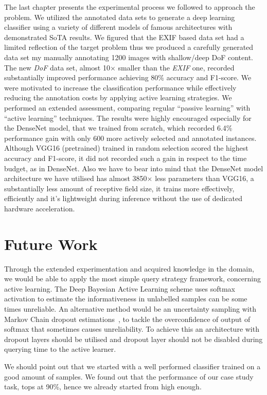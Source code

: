 The last chapter presents the experimental process we followed to approach the problem. We utilized the annotated data sets to generate a deep learning classifier using a variety of different models of famous architectures with demonstrated SoTA results. We figured that the EXIF based data set had a limited reflection of the target problem thus we produced a carefully generated data set my manually annotating 1200 images with shallow/deep DoF content. The new \textit{DoF} data set, almost 10$\times$ smaller than the \textit{EXIF} one, recorded substantially improved performance achieving 80\% accuracy and F1-score.
We were motivated to increase the classification performance while effectively reducing the annotation costs by applying active learning strategies. We performed an extended assessment, comparing regular ``passive learning'' with ``active learning'' techniques. The results were highly encouraged especially for the DenseNet model, that we trained from scratch, which recorded 6.4\% performance gain with only 600 more actively selected and annotated instances. Although VGG16 (pretrained) trained in random selection scored the highest accuracy and F1-score, it did not recorded such a gain in respect to the time budget, as in DenseNet. 
Also we have to bear into mind that the DenseNet model architecture we have utilised has almost 3850$\times$ less parameters than VGG16, a substantially less amount of receptive field size, it trains more effectively, efficiently and it's lightweight during inference without the use of dedicated hardware acceleration.

\section{Future Work}

Through the extended experimentation and acquired knowledge in the domain, we would be able to apply the most simple query strategy framework, concerning active learning. The Deep Bayesian Active Learning scheme uses softmax activation to estimate the informativeness in unlabelled samples can be some times unreliable. An alternative method would be an uncertainty sampling with Markov Chain dropout estimations~\cite{gal2015bayesian}, to tackle the overconfidence of output of softmax that sometimes causes unreliability.
To achieve this an architecture with dropout layers should be utilised and dropout layer should not be disabled during querying time to the active learner.

We should point out that we started with a well performed classifier trained on a good amount of samples. We found out that the performance of our case study task, tops at 90\%, hence we already started from high enough.

